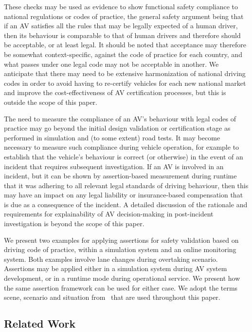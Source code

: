 These checks may be used as evidence to show functional safety compliance to national regulations or codes of practice, the general safety argument being that if an AV satisfies all the rules that may be legally expected of a human driver, then its behaviour is comparable to that of human drivers and therefore should be acceptable, or at least legal. It should be noted that acceptance may therefore be somewhat context-specific, against the code of practice for each country, and what passes under one legal code may not be acceptable in another. We anticipate that there may need to be extensive harmonization of national driving codes in order to avoid having to re-certify vehicles for each new national market and improve the cost-effectiveness of AV certification processes, but this is outside the scope of this paper.

The need to measure the compliance of an AV's behaviour with legal codes of practice may go beyond the initial design validation or certification stage as performed in simulation and (to some extent) road tests. It may become necessary to measure such compliance during vehicle operation, for example to establish that the vehicle's behaviour is correct (or otherwise) in the event of an incident that requires subsequent investigation. If an AV is involved in an incident, but it can be shown by assertion-based measurement during runtime that it was adhering to all relevant legal standards of driving behaviour, then this may have an impact on any legal liability or insurance-based compensation that is due as a consequence of the incident. A detailed discussion of the rationale and requirements for explainability of AV decision-making in post-incident investigation is beyond the scope of this paper.

We present two examples for applying assertions for safety validation based on driving code of practice, within a simulation system and an online monitoring system. Both examples involve lane changes during overtaking scenario. Assertions may be applied either in a simulation system during AV system development, or in a runtime mode during operational service. We present how the same assertion framework can be used for either case. We adopt the terms scene, scenario and situation from~\cite{Ulbrich2015} that are used throughout this paper. 


\subsection{Related Work}
\label{Related_work}

